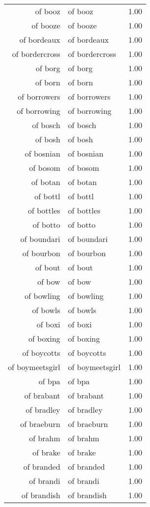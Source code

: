 \begin{table}[ht]
\begin{tabular}{rlr}
  of booz & of booz & 1.00 \\ 
  of booze & of booze & 1.00 \\ 
  of bordeaux & of bordeaux & 1.00 \\ 
  of bordercross & of bordercross & 1.00 \\ 
  of borg & of borg & 1.00 \\ 
  of born & of born & 1.00 \\ 
  of borrowers & of borrowers & 1.00 \\ 
  of borrowing & of borrowing & 1.00 \\ 
  of bosch & of bosch & 1.00 \\ 
  of bosh & of bosh & 1.00 \\ 
  of bosnian & of bosnian & 1.00 \\ 
  of bosom & of bosom & 1.00 \\ 
  of botan & of botan & 1.00 \\ 
  of bottl & of bottl & 1.00 \\ 
  of bottles & of bottles & 1.00 \\ 
  of botto & of botto & 1.00 \\ 
  of boundari & of boundari & 1.00 \\ 
  of bourbon & of bourbon & 1.00 \\ 
  of bout & of bout & 1.00 \\ 
  of bow & of bow & 1.00 \\ 
  of bowling & of bowling & 1.00 \\ 
  of bowls & of bowls & 1.00 \\ 
  of boxi & of boxi & 1.00 \\ 
  of boxing & of boxing & 1.00 \\ 
  of boycotts & of boycotts & 1.00 \\ 
  of boymeetsgirl & of boymeetsgirl & 1.00 \\ 
  of bpa & of bpa & 1.00 \\ 
  of brabant & of brabant & 1.00 \\ 
  of bradley & of bradley & 1.00 \\ 
  of braeburn & of braeburn & 1.00 \\ 
  of brahm & of brahm & 1.00 \\ 
  of brake & of brake & 1.00 \\ 
  of branded & of branded & 1.00 \\ 
  of brandi & of brandi & 1.00 \\ 
  of brandish & of brandish & 1.00 \\ 

\end{tabular}
\end{table}
